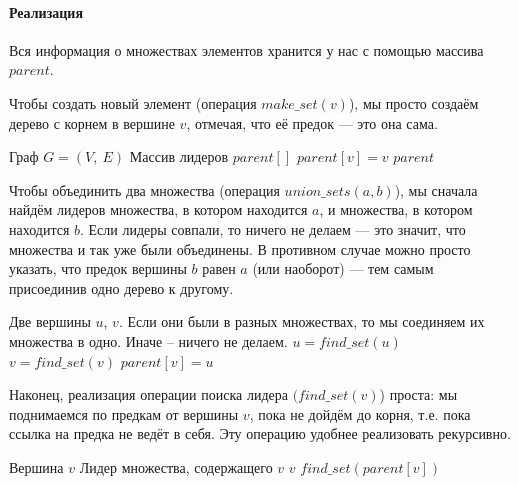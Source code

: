 \documentclass[a4paper,12pt]{article}
\begin{document}
\paragraph{Реализация}

Вся информация о множествах элементов хранится у нас с помощью массива $parent$.

Чтобы создать новый элемент (операция $make\_set(v)$), мы просто создаём дерево с корнем в вершине $v$, отмечая, что её предок — это она сама.

\begin{algorithm}
  	\caption{($(V,\ E)$)}
	\begin{algorithmic}
	    \Require Граф $G = (V,\ E)$
	    \Ensure Массив лидеров $parent[]$
	    \State
	        \State $parent[v] = v$
	   \EndFor
	   \Return $parent$
	\end{algorithmic}
\end{algorithm}

Чтобы объединить два множества (операция $union\_sets(a,b)$), мы сначала найдём лидеров множества, в котором находится $a$, и множества, в котором находится $b$. Если лидеры совпали, то ничего не делаем — это значит, что множества и так уже были объединены. В противном случае можно просто указать, что предок вершины $b$ равен $a$ (или наоборот) — тем самым присоединив одно дерево к другому.

\begin{algorithm}
  	\caption{($u,\ v$)}
	\begin{algorithmic}
	    \Require Две вершины $u$, $v$.
	    \Ensure Если они были в разных множествах, то мы соединяем их множества в одно. Иначе -- ничего не делаем.
	    \State
	    \State $u = find\_set(u)$
	    \State $v = find\_set(v)$
	    \If{$u \neq v$}
	        \State $parent[v] = u$
	   \EndIf
	\end{algorithmic}
\end{algorithm}

Наконец, реализация операции поиска лидера $(find\_set(v)$) проста: мы поднимаемся по предкам от вершины $v$, пока не дойдём до корня, т.е. пока ссылка на предка не ведёт в себя. Эту операцию удобнее реализовать рекурсивно.

\begin{algorithm}
  	\caption{($v$)}
	\begin{algorithmic}
	    \Require Вершина $v$
	    \Ensure Лидер множества, содержащего $v$
	    \State
	    \If{$parent[v] == v$}
	        \State \Return $v$
	   \EndIf
	   \State \Return $find\_set(parent[v])$
	\end{algorithmic}
\end{algorithm}
\end{document}
